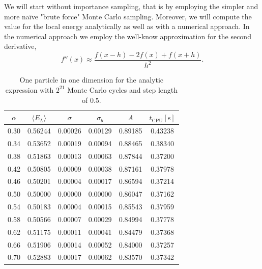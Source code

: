 \documentclass[
    a4paper, aps, twocolumn, floatfix, superscriptaddress, nofootinbib]{revtex4-1}
\newcommand{\1}{\mathds{1}}
\begin{document}
    We will start without importance sampling, that is by employing the simpler and more naïve "brute force" Monte Carlo
    sampling. Moreover, we will compute the value for the local energy analytically as well as with a numerical approach.
    In the numerical approach we employ the well-know approximation for the second derivative,
    \begin{equation}
            f''(x) \approx \frac{f(x-h) - 2f(x) + f(x+h)}{h^2}.
    \end{equation}

    \begin{table}
        \centering
        \caption{One particle in one dimension for the analytic expression with
        $2^{21}$ Monte Carlo cycles and step length of $0.5$.}
        \begin{ruledtabular}
            \begin{tabular}{cccccc}
                $\alpha$ & $\langle  E_L\rangle$ & $\sigma$ & $\sigma_b$ & $A$
                & $t_{\text{CPU}} [\si{\second}]$ \\
                \hline
                0.30&0.56244&0.00026&0.00129&0.89185&0.43238\\
                0.34&0.53652&0.00019&0.00094&0.88465&0.38340\\
                0.38&0.51863&0.00013&0.00063&0.87844&0.37200\\
                0.42&0.50805&0.00009&0.00038&0.87161&0.37978\\
                0.46&0.50201&0.00004&0.00017&0.86594&0.37214\\
                0.50&0.50000&0.00000&0.00000&0.86047&0.37162\\
                0.54&0.50183&0.00004&0.00015&0.85543&0.37959\\
                0.58&0.50566&0.00007&0.00029&0.84994&0.37778\\
                0.62&0.51175&0.00011&0.00041&0.84479&0.37368\\
                0.66&0.51906&0.00014&0.00052&0.84000&0.37257\\
                0.70&0.52883&0.00017&0.00062&0.83570&0.37342\\
            \end{tabular}
        \end{ruledtabular}
        \label{tab:1D1N_analytic}
    \end{table}
\end{document}
